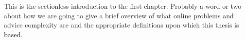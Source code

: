 This is the sectionless introduction to the first chapter. Probably a word
or two about how we are going to give a brief overview of what online
problems and advice complexity are and the appropriate definitions upon
which this thesis is based.
